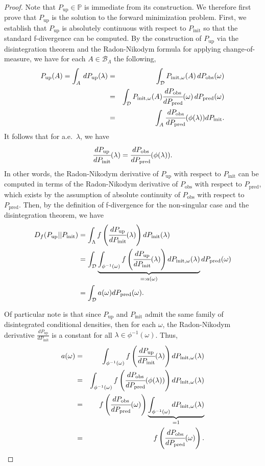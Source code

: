 \documentclass{article}
\newcommand{\p}{\mathbb{P}}
\newcommand{\B}{\mathcal{B}}
\newcommand{\dspace}{\mathcal{D}}
\newcommand{\initmeas}{P_{\text{init}}}
\newcommand{\initmeasomega}{P_{\text{init}, \omega}}
\newcommand{\updatemeas}{P_{\text{up}}}
\newcommand{\predictmeas}{P_\text{pred}}
\newcommand{\obsmeas}{P_{\text{obs}}}
\begin{document}
\begin{proof}
Note that $\updatemeas\in\p$ is immediate from its construction. 
We therefore first prove that $\updatemeas$ is the solution to the forward minimization problem.
First, we establish that $\updatemeas$ is absolutely continuous with respect to $\initmeas$ so that the standard f-divergence can be computed. 
By the construction of $\updatemeas$ via the disintegration theorem and the Radon-Nikodym formula for applying change-of-measure, we have for each $A\in \B_\Lambda$ the following, 
\begin{eqnarray*}
    \updatemeas(A) =\int_A \, d\updatemeas(\lambda) &=& \int_\dspace \initmeasomega(A) \, d\obsmeas(\omega)\\
                &=&\int_{\dspace} \initmeasomega(A) \cfrac{d\obsmeas}{d\predictmeas}(\omega)\, d\predictmeas(\omega) \\
                &=&\int_A  \cfrac{d\obsmeas}{d\predictmeas}(\phi(\lambda)) dP_\text{init}.
\end{eqnarray*}
It follows that for a.e.~$\lambda$, we have
\[
    \cfrac{d\updatemeas}{d\initmeas}(\lambda) = \cfrac{d\obsmeas}{d\predictmeas}(\phi(\lambda)).
\]
In other words, the Radon-Nikodym derivative of $\updatemeas$ with respect to $P_\text{init}$ can be computed in terms of the Radon-Nikodym derivative of $\obsmeas$ with respect to $\predictmeas$, which exists by the assumption of absolute continuity of $\obsmeas$ with respect to $\predictmeas$. 
Then, by the definition of f-divergence for the non-singular case and the disintegration theorem, we have
\begin{align}\label{eq:Aint}
    D_{f}(\updatemeas || \initmeas) &=  \int_{\Lambda} f\left(\cfrac{d\updatemeas}{d\initmeas}(\lambda)\right) d\initmeas(\lambda) \nonumber \\
    &= \int_{\mathcal{D}} \underbrace{\int_{\phi^{-1}(\omega)} f\left(\cfrac{d\updatemeas}{d\initmeas}(\lambda)\right) d\initmeasomega(\lambda)}_{=: a(\omega)} d\predictmeas(\omega) \\ 
    &= \int_{\mathcal{D}} a(\omega) d\predictmeas(\omega) \nonumber.
\end{align}

Of particular note is that since $\updatemeas$ and $P_\text{init}$ admit the same family of disintegrated conditional densities, then for each $\omega$, the Radon-Nikodym derivative $\frac{d\updatemeas}{d\initmeas}$ is a constant for all $\lambda\in\phi^{-1}(\omega)$.
Thus,
\begin{eqnarray*}
    a(\omega) &=& \int_{\phi^{-1}(\omega)} f\left(\cfrac{d\updatemeas}{d\initmeas}(\lambda)\right) d\initmeasomega(\lambda) \\
            &=& \int_{\phi^{-1}(\omega)} f\left(\cfrac{d\obsmeas}{d\predictmeas}(\phi(\lambda))\right) d\initmeasomega(\lambda)  \\
            &=& f\left(\cfrac{d\obsmeas}{d\predictmeas}(\omega)\right) \underbrace{\int_{\phi^{-1}(\omega)} d\initmeasomega(\lambda)}_{=1}\\
            &=& f\left(\cfrac{d\obsmeas}{d\predictmeas}(\omega)\right).
\end{eqnarray*}


\end{proof}
\end{document}
